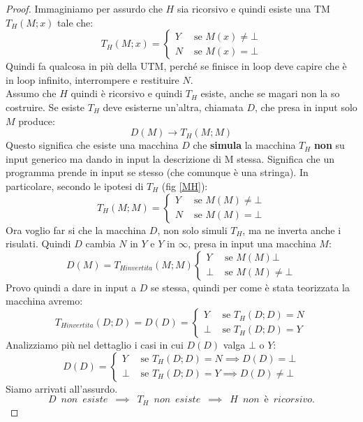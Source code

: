 \begin{proof}
  Immaginiamo per assurdo che $H$ sia ricorsivo e quindi esiste una TM $T_H(M;x)$ tale che:
  \[T_H(M;x) =
    \begin{cases}
      Y& \mbox{ se }M(x)\neq \bot\\
      N& \mbox{ se }M(x) = \bot
      \label{MH}
    \end{cases}
  \]
  Quindi fa qualcosa in più della UTM, perché se finisce in loop deve capire che
  è in loop infinito, interrompere e restituire $N$.\\
  Assumo che $H$ quindi è ricorsivo e quindi $T_H$ esiste, anche se magari non
  la so costruire. Se esiste $T_H$ deve esisterne un'altra, chiamata $D$, che
  presa in input solo $M$ produce:
  \[D(M)\to T_H(M;M)\]
  Questo significa che esiste una macchina $D$ che \textbf{simula} la macchina $T_H$ \textbf{non} su input generico ma dando in input la descrizione di M stessa. Significa che un programma prende in input se stesso (che comunque è una stringa). In particolare, secondo le ipotesi di $T_H$ (fig \ref{MH}):
  \[T_H(M;M)=
    \begin{cases}
      Y& \mbox{ se }M(M)\neq \bot\\
      N& \mbox{ se }M(M)=\bot
    \end{cases}
  \]
  Ora voglio far si che la macchina $D$, non solo simuli $T_H$, ma ne inverta anche i risulati. Quindi $D$ cambia $N$ in $Y$ e $Y$ in $\infty$, presa in input una macchina
  $M$:
    \[D(M) = T_{Hinvertita}(M;M)
    \begin{cases}
      Y& \mbox{ se }M(M) \bot\\
      \bot& \mbox{ se }M(M)\neq \bot
    \end{cases}
  \]
  Provo quindi a dare in input a $D$ se stessa, quindi per come è stata teorizzata la macchina avremo:
  \[T_{Hinvertita}(D;D) = D(D) = 
    \begin{cases}
      Y& \mbox{ se }T_H(D;D) = N\\
      \bot & \mbox{ se }T_H(D;D) = Y
    \end{cases}
  \]
  Analizziamo più nel dettaglio i casi in cui $D(D)$ valga $\bot$ o $Y$:
    \[D(D) = 
    \begin{cases}
      Y& \mbox{ se }T_H(D;D) = N \implies D(D) = \bot\\
      \bot & \mbox{ se }T_H(D;D) = Y  \implies D(D) \neq\bot
    \end{cases}
  \]
  Siamo arrivati all'assurdo.  \\
  \[D\,\,\,non\,\,\,esiste\,\,\,\implies\,\,\,T_H\,\,\,non\,\,\,esiste\,\,\,\implies\,\,\,H\,\,\,non\,\,\,è\,\,\,ricorsivo.\]
\end{proof}
